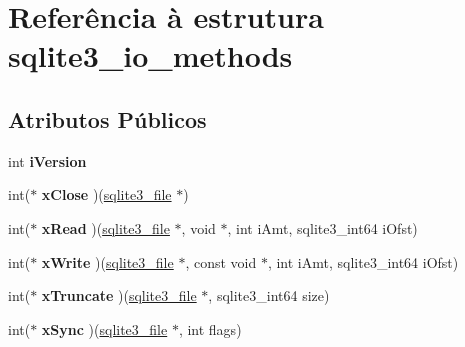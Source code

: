 \hypertarget{structsqlite3__io__methods}{\section{Referência à estrutura sqlite3\-\_\-io\-\_\-methods}
\label{structsqlite3__io__methods}
}
\subsection*{Atributos Públicos}
\begin{DoxyCompactItemize}
\item 
\hypertarget{structsqlite3__io__methods_ad1c72bdfde750a09a797f314a096a965}{int {\bfseries i\-Version}}\label{structsqlite3__io__methods_ad1c72bdfde750a09a797f314a096a965}

\item 
\hypertarget{structsqlite3__io__methods_a3c021d16959e0533f507b3212681a22e}{int($\ast$ {\bfseries x\-Close} )(\hyperlink{structsqlite3__file}{sqlite3\-\_\-file} $\ast$)}\label{structsqlite3__io__methods_a3c021d16959e0533f507b3212681a22e}

\item 
\hypertarget{structsqlite3__io__methods_a19870694752f65e8738d89d871d0ca7f}{int($\ast$ {\bfseries x\-Read} )(\hyperlink{structsqlite3__file}{sqlite3\-\_\-file} $\ast$, void $\ast$, int i\-Amt, sqlite3\-\_\-int64 i\-Ofst)}\label{structsqlite3__io__methods_a19870694752f65e8738d89d871d0ca7f}

\item 
\hypertarget{structsqlite3__io__methods_a803b39bc86bbff522602597fa4390e0f}{int($\ast$ {\bfseries x\-Write} )(\hyperlink{structsqlite3__file}{sqlite3\-\_\-file} $\ast$, const void $\ast$, int i\-Amt, sqlite3\-\_\-int64 i\-Ofst)}\label{structsqlite3__io__methods_a803b39bc86bbff522602597fa4390e0f}

\item 
\hypertarget{structsqlite3__io__methods_a981cc60fc305bfb38eecd7123a513a20}{int($\ast$ {\bfseries x\-Truncate} )(\hyperlink{structsqlite3__file}{sqlite3\-\_\-file} $\ast$, sqlite3\-\_\-int64 size)}\label{structsqlite3__io__methods_a981cc60fc305bfb38eecd7123a513a20}

\item 
\hypertarget{structsqlite3__io__methods_a8d39ac02aeb1eb63622008217031b098}{int($\ast$ {\bfseries x\-Sync} )(\hyperlink{structsqlite3__file}{sqlite3\-\_\-file} $\ast$, int flags)}\label{structsqlite3__io__methods_a8d39ac02aeb1eb63622008217031b098}


\end{DoxyCompactItemize}
